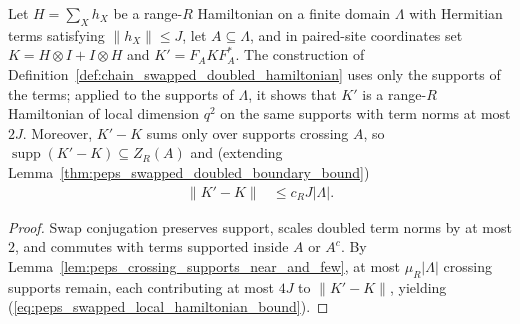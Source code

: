\begin{lemma}
    \label{thm:peps_swapped_local_hamiltonian}
    \leanok
    Let $H=\sum_Xh_X$ be a range-$R$ Hamiltonian on a finite domain $\Lambda$
    with Hermitian terms satisfying $\|h_X\|\le J$, let $A\subseteq\Lambda$,
    and in paired-site coordinates set $K=H\otimes I+I\otimes H$ and
    $K'=F_AKF_A^*$. The construction of
    Definition~\ref{def:chain_swapped_doubled_hamiltonian} uses only the
    supports of the terms; applied to the supports of $\Lambda$, it shows that
    $K'$ is a range-$R$ Hamiltonian of local dimension
    $q^2$ on the same supports with term norms at most $2J$. Moreover, $K'-K$ sums
    only over supports crossing $A$, so $\operatorname{supp}(K'-K)\subseteq Z_R(A)$
    and (extending Lemma~\ref{thm:peps_swapped_doubled_boundary_bound})
    \begin{align}
        \|K'-K\| & \le c_RJ|\Lambda|.
        \label{eq:peps_swapped_local_hamiltonian_bound}
    \end{align}
\end{lemma}
\begin{proof}
    \leanok
    Swap conjugation preserves support, scales doubled term norms by at most $2$,
    and commutes with terms supported inside $A$ or $A^c$. By
    Lemma~\ref{lem:peps_crossing_supports_near_and_few}, at most
    $\mu_R|\Lambda|$ crossing supports remain, each contributing at most $4J$
    to $\|K'-K\|$, yielding (\ref{eq:peps_swapped_local_hamiltonian_bound}).
\end{proof}

